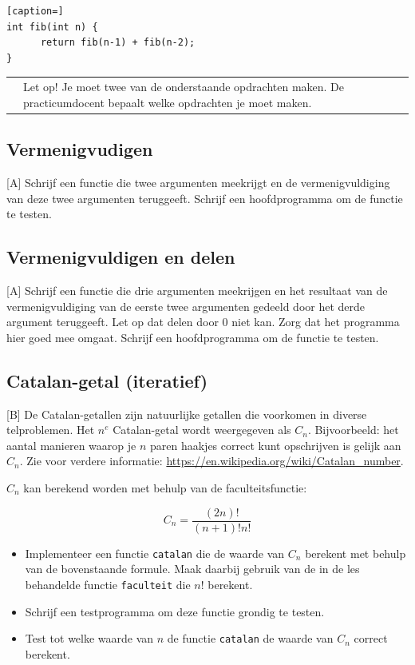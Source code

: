 \documentclass[a4paper,10pt,fleqn,twoside]{article}
\newcommand{\letop}{%
\vspace{4ex plus 1ex minus 1ex}
\begin{mdframed}[outerlinewidth = 1 ,%
roundcorner = 4 pt,%
leftmargin = 40,%
rightmargin = 40,%
backgroundcolor = yellow!40,%
outerlinecolor = red!70!black,%
innertopmargin = \topskip,%
splittopskip = \topskip,%
]
\begin{tabularx}{\linewidth}{m{1cm}X}
\Large\leftpointright & Let op! Je moet twee van de onderstaande opdrachten maken. De practicumdocent bepaalt welke opdrachten je moet maken.
\end{tabularx}
\end{mdframed}
\vspace{4ex plus 1ex minus 1ex}
}
\begin{document}
\begin{lstlisting}[caption=]
int fib(int n) {
      return fib(n-1) + fib(n-2);
} 
\end{lstlisting}

\vspace*{-0.99em}
\letop
\clearpage


\subsection{Vermenigvudigen}[A]
Schrijf een functie die twee argumenten meekrijgt en de vermenigvuldiging van deze twee argumenten teruggeeft. Schrijf een hoofdprogramma om de functie te testen.

\subsection{Vermenigvuldigen en delen}[A]
Schrijf een functie die drie argumenten meekrijgen en het resultaat van de vermenigvuldiging van de eerste twee argumenten gedeeld door het derde argument teruggeeft. Let op dat delen door 0 niet kan. Zorg dat het programma hier goed mee omgaat. Schrijf een hoofdprogramma om de functie te testen.

\subsection{Catalan-getal (iteratief)}[B]
De Catalan-getallen zijn natuurlijke getallen die voorkomen in diverse telproblemen. Het $n^e$ Catalan-getal wordt weergegeven als $C_n$. Bijvoorbeeld: het aantal manieren waarop je $n$ paren haakjes correct kunt opschrijven is gelijk aan $C_n$. Zie voor verdere informatie: \url{https://en.wikipedia.org/wiki/Catalan_number}.

$C_n$ kan berekend worden met behulp van de faculteitsfunctie: 

\begin{equation*}
C_n = \dfrac{(2n)!}{(n+1)!n!}
\end{equation*}

\begin{itemize}
\item Implementeer een functie \lstinline|catalan| die de waarde van $C_n$ berekent met behulp van de bovenstaande formule. Maak daarbij gebruik van de in de les behandelde functie \lstinline|faculteit| die $n!$ berekent.
\item Schrijf een testprogramma om deze functie grondig te testen.
\item Test tot welke waarde van $n$ de functie \lstinline|catalan| de waarde van $C_n$ correct berekent.
\end{itemize}
\end{document}

